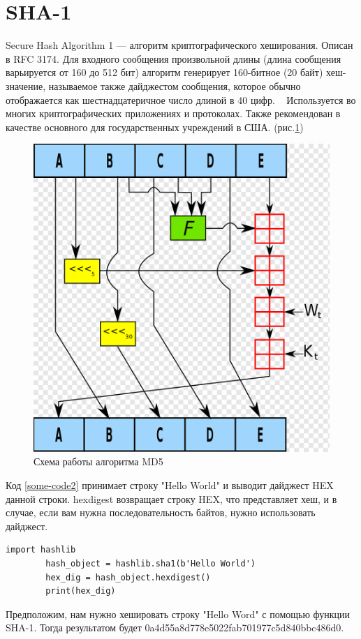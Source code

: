 \documentclass[a4paper, 12pt, oneside]{scrartcl}
\begin{document}
	\section{SHA-1}\label{sec:section3}
	Secure Hash Algorithm 1 — алгоритм криптографического хеширования. Описан в RFC 3174. Для входного сообщения произвольной длины (длина сообщения варьируется от 160 до 512 бит) алгоритм генерирует 160-битное (20 байт) хеш-значение, называемое также дайджестом сообщения, которое обычно отображается как шестнадцатеричное число длиной в 40 цифр.
	~\cite{sha1}
	Используется во многих криптографических приложениях и протоколах. Также рекомендован в качестве основного для государственных учреждений в США. (рис.\ref{fig:key2})
	\begin{figure}[h]
		\centering
		\includegraphics[scale=0.3]{sha1}
		\caption{Схема работы алгоритма MD5}
		\label{fig:key2}
	\end{figure}
	\par
	
	Код \ref{some-code2} принимает строку "Hello World" и выводит дайджест HEX данной строки. hexdigest возвращает строку HEX, что представляет хеш, и в случае, если вам нужна последовательность байтов, нужно использовать дайджест.~\cite{sha2}
	\begin{lstlisting}[label=some-code2,caption= SHA-1]
		import hashlib
		hash_object = hashlib.sha1(b'Hello World')
		hex_dig = hash_object.hexdigest()
		print(hex_dig)
	\end{lstlisting}
	Предположим, нам нужно хешировать строку "Hello Word" с помощью функции SHA-1. Тогда результатом будет 0a4d55a8d778e5022fab701977c5d840bbc486d0.
	
	
	
\end{document}
